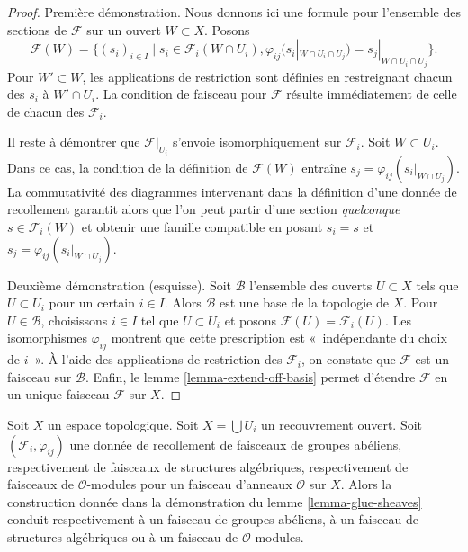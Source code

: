 \begin{proof}
Première démonstration. Nous donnons ici une formule pour l'ensemble
des sections de $\mathcal{F}$ sur un ouvert $W \subset X$. Posons
$$
\mathcal{F}(W) =
\{
(s_i)_{i \in I} \mid
s_i \in \mathcal{F}_i(W \cap U_i),
\varphi_{ij}(s_i|_{W \cap U_i \cap U_j}) = s_j|_{W \cap U_i \cap U_j}
\}.
$$
Pour $W' \subset W$, les applications de restriction sont définies en
restreignant chacun des $s_i$ à $W' \cap U_i$. La condition de faisceau
pour $\mathcal{F}$ résulte immédiatement de celle de chacun des
$\mathcal{F}_i$.

\medskip\noindent
Il reste à démontrer que $\mathcal{F}|_{U_i}$ s'envoie
isomorphiquement sur $\mathcal{F}_i$. Soit $W \subset U_i$.
Dans ce cas, la condition de la définition de $\mathcal{F}(W)$ entraîne
$s_j = \varphi_{ij}(s_i|_{W \cap U_j})$.
La commutativité des diagrammes intervenant dans la définition d'une
donnée de recollement garantit alors que l'on peut partir d'une section
{\it quelconque} $s \in \mathcal{F}_i(W)$ et obtenir une famille compatible
en posant $s_i = s$ et
$s_j = \varphi_{ij}(s_i|_{W \cap U_j})$.

\medskip\noindent
Deuxième démonstration (esquisse). Soit $\mathcal{B}$ l'ensemble des ouverts
$U \subset X$ tels que $U \subset U_i$ pour un certain $i \in I$.
Alors $\mathcal{B}$ est une base de la topologie de $X$. Pour
$U \in \mathcal{B}$, choisissons $i \in I$ tel que $U \subset U_i$ et
posons $\mathcal{F}(U) = \mathcal{F}_i(U)$.
Les isomorphismes $\varphi_{ij}$ montrent que cette prescription est
«~indépendante du choix de $i$~». À l'aide des applications de restriction
des $\mathcal{F}_i$, on constate que $\mathcal{F}$ est un faisceau sur
$\mathcal{B}$. Enfin, le lemme \ref{lemma-extend-off-basis} permet
d'étendre $\mathcal{F}$ en un unique faisceau $\mathcal{F}$ sur $X$.
\end{proof}

\begin{lemma}
\label{lemma-glue-sheaves-structures}
Soit $X$ un espace topologique.
Soit $X = \bigcup U_i$ un recouvrement ouvert.
Soit $(\mathcal{F}_i, \varphi_{ij})$ une donnée de recollement
de faisceaux de groupes abéliens, respectivement de faisceaux de
structures algébriques, respectivement de faisceaux de
$\mathcal{O}$-modules pour un faisceau d'anneaux $\mathcal{O}$ sur $X$.
Alors la construction donnée dans la démonstration du
lemme \ref{lemma-glue-sheaves} conduit respectivement à un faisceau de
groupes abéliens, à un faisceau de structures algébriques ou à un
faisceau de $\mathcal{O}$-modules.
\end{lemma}

